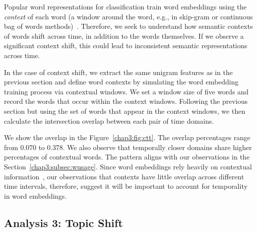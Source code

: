Popular word representations for classification train word embeddings using the \textit{context} of each word (a window around the word, e.g., in skip-gram or continuous bag of words methods)~\cite{mikolov2013distributed, bojanowski2017enriching}.
Therefore, we seek to understand how semantic contexts of words shift across time, in addition to the words themselves. 
If we observe a significant context shift, this could lead to inconsistent semantic representations across time.

In the case of context shift, we extract the same unigram features as in the previous section and define word contexts by simulating the word embedding training process via contextual windows. We set a window size of five words and record the words that occur within the context windows. Following the previous section but using the set of words that appear in the context windows, we then calculate the intersection overlap between each pair of time domains.  

We show the overlap in the Figure~\ref{chap3:fig:ctt}.
The overlap percentages range from 0.070 to 0.378. We also observe that temporally closer domains share higher percentages of contextual words. The pattern aligns with our observations in the Section~\ref{chap3:subsec:wusage}. 
Since word embeddings rely heavily on contextual information~\cite{mikolov2013distributed}, our observations that contexts have little overlap across different time intervals, therefore, suggest it will be important to account for temporality in word embeddings.


\subsection{Analysis 3: Topic Shift}
\label{chap3:subsec:topic}

